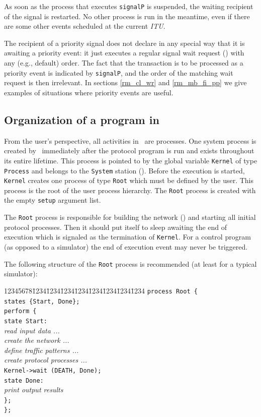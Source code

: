 As soon as the process that executes {\tt signalP} is suspended, the
waiting recipient of the signal is restarted.
No other process is run
in the meantime, even if there are some other events scheduled at
the current {\em ITU}.

The recipient of a priority signal
does not declare in any special way that it is awaiting a priority event:
it just executes a regular signal wait request () with
any (e.g., default) order.
The fact that the transaction is to be processed as a
priority event is indicated by {\tt signalP}, and the order of the matching
wait request is then irrelevant.
In sections \ref{rm_cl_wr} and \ref{rm_mb_fi_pp} we give examples of situations
where priority events are useful.

\subsection{Organization of a program in \smurph}
\label{rm_pr_or}

From the user's perspective, all activities in \smurph\ are processes.
One system process is created by \smurph\ immediately
after the protocol program is run
and exists throughout its entire lifetime.
This process is pointed to by the global variable {\tt Kernel} of type
{\tt Process} and belongs to the {\tt System} station ().
Before the execution is started, {\tt Kernel} creates one process of type
{\tt Root} which must be defined by the user.
This process is the root of the user process hierarchy.
The {\tt Root} process is created with the empty {\tt setup} argument list.

The {\tt Root} process is responsible for building the network ()
and starting all initial protocol processes.
Then it should put itself to sleep awaiting the end of execution which
is signaled as the termination of {\tt Kernel}.
For a control program (as opposed to a simulator) the end of execution event
may never be triggered.

The following structure of the {\tt Root} process is recommended (at least
for a typical simulator):
{\tt\begin{tabbing}
12345678\=1234\=1234\=1234\=1234\=1234\=1234\=1234\=1234\kill
\> {\tt process Root \{} \\
\> \> {\tt states \{Start, Done\};} \\
\> \> {\tt perform \{} \\
\> \> \> {\tt state Start:} \\
\> \> \> \> {\em read input data ...} \\
\> \> \> \> {\em create the network ...} \\
\> \> \> \> {\em define traffic patterns ...} \\
\> \> \> \> {\em create protocol processes ...} \\
\> \> \> \> {\tt Kernel->wait (DEATH, Done);} \\
\> \> \> {\tt state Done:} \\
\> \> \> \> {\em print output results} \\
\> \> {\tt \};} \\
\> {\tt \};}
\end{tabbing}}

